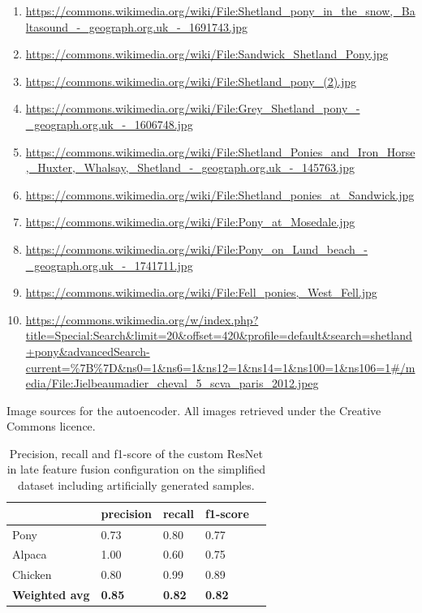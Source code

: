 \documentclass{l4proj}
\begin{document}
\begin{appendices}
\begin{captionedList}
  \begin{enumerate}
    \item{\url{https://commons.wikimedia.org/wiki/File:Shetland_pony_in_the_snow,_Baltasound_-_geograph.org.uk_-_1691743.jpg}}
    \item{\url{https://commons.wikimedia.org/wiki/File:Sandwick_Shetland_Pony.jpg}}
    \item{\url{https://commons.wikimedia.org/wiki/File:Shetland_pony_(2).jpg}}
    \item{\url{https://commons.wikimedia.org/wiki/File:Grey_Shetland_pony_-_geograph.org.uk_-_1606748.jpg}}
    \item{\url{https://commons.wikimedia.org/wiki/File:Shetland_Ponies_and_Iron_Horse,_Huxter,_Whalsay,_Shetland_-_geograph.org.uk_-_145763.jpg}}
    \item{\url{https://commons.wikimedia.org/wiki/File:Shetland_ponies_at_Sandwick.jpg}}
    \item{\url{https://commons.wikimedia.org/wiki/File:Pony_at_Mosedale.jpg}}
    \item{\url{https://commons.wikimedia.org/wiki/File:Pony_on_Lund_beach_-_geograph.org.uk_-_1741711.jpg}}
    \item{\url{https://commons.wikimedia.org/wiki/File:Fell_ponies,_West_Fell.jpg}}
    \item{\url{https://commons.wikimedia.org/w/index.php?title=Special:Search&limit=20&offset=420&profile=default&search=shetland+pony&advancedSearch-current=%7B%7D&ns0=1&ns6=1&ns12=1&ns14=1&ns100=1&ns106=1#/media/File:Jielbeaumadier_cheval_5_scva_paris_2012.jpeg}}
  \end{enumerate}
  \caption{Image sources for the autoencoder. All images retrieved under the Creative Commons licence.}
  \label{image_sources}
\end{captionedList}

\begin{table}[H]
  \centering
  \begin{tabular}{@{}lllll@{}}
  \toprule
                        & \textbf{precision} & \textbf{recall} & \textbf{f1-score} &  \\ \midrule
  Pony                  & 0.73               & 0.80            & 0.77              &  \\
  Alpaca                & 1.00               & 0.60            & 0.75              &  \\
  Chicken               & 0.80               & 0.99            & 0.89              &  \\
  \midrule
  \textbf{Weighted avg} & \textbf{0.85}      & \textbf{0.82}   & \textbf{0.82}     &  \\ \bottomrule
  \end{tabular}
  \caption{Precision, recall and f1-score of the custom ResNet in late feature fusion configuration on the simplified dataset including artificially generated samples.}
  \label{table:auto_scores_normal}
\end{table}


\end{appendices}
\end{document}
